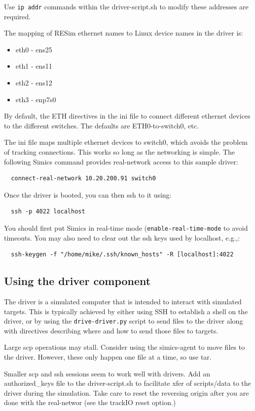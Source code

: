 \documentclass[titlepage]{article}
\begin{document}
\begin{appendices}
Use {\tt ip addr} commands within the driver-script.sh to modify these addresses are required.

The mapping of RESim ethernet names to Linux device names in the driver is: 

\begin{itemize}
\item eth0 - ens25
\item eth1 - ens11
\item eth2 - ens12
\item eth3 - enp7s0
\end{itemize}

By default, the ETH directives in the ini file to connect different ethernet devices to the
different switches.  The defaults are ETH0-to-switch0, etc.

The ini file maps multiple ethernet devices to switch0, which avoids the problem of
tracking connections.  This works so long as the networking is simple.
The following Simics command provides real-network access to this sample driver:
\begin{verbatim}
  connect-real-network 10.20.200.91 switch0
\end{verbatim}
Once the driver is booted, you can then ssh to it using:
\begin{verbatim}
  ssh -p 4022 localhost
\end{verbatim}
You should first put Simics in real-time mode ({\tt enable-real-time-mode} to avoid timeouts.  You may also need to clear out the
ssh keys used by localhost, e.g.,:
\begin{verbatim}
  ssh-keygen -f "/home/mike/.ssh/known_hosts" -R [localhost]:4022
\end{verbatim}

\subsection{Using the driver component}
The driver is a simulated computer that is intended to interact with simulated targets.  This is typically
achieved by either using SSH to establish a shell on the driver, or by using the {\tt drive-driver.py}
script to send files to the driver along with directives describing where and how to send those files to
targets.

Large scp operations may stall.  Consider using the simics-agent to move files to the driver.  However,
these only happen one file at a time, so use tar.

Smaller scp and ssh sessions seem to work well with drivers.  Add an authorized\_keys file to the driver-script.sh to facilitate xfer of scripts/data to the driver
during the simulation.  Take care to reset the reversing origin after you are done with the real-networ (see the trackIO reset option.)



\end{appendices}
\end{document}
